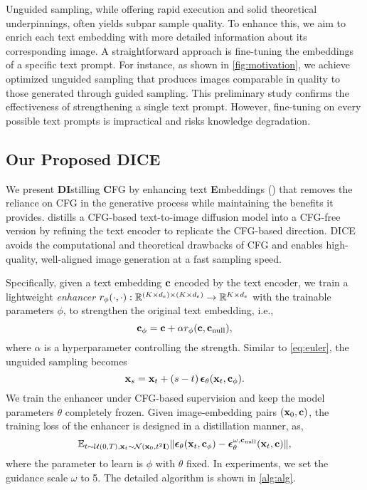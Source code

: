 Unguided sampling, while offering rapid execution and solid theoretical underpinnings, often yields subpar sample quality. To enhance this, we aim to enrich each text embedding with more detailed information about its corresponding image. A straightforward approach is fine-tuning the embeddings of a specific text prompt. For instance, as shown in \cref{fig:motivation}, we achieve optimized unguided sampling that produces images comparable in quality to those generated through guided sampling. 
This preliminary study confirms the effectiveness of strengthening a single text prompt. However, fine-tuning on every possible text prompts is impractical and risks knowledge degradation. 

\subsection{Our Proposed DICE}
\label{sec:dice}

We present \textbf{D}\textbf{I}stilling \textbf{C}FG by enhancing text \textbf{E}mbeddings (\ourName) that removes the reliance on CFG in the generative process while maintaining the benefits it provides. \ourName distills a CFG-based text-to-image diffusion model into a CFG-free version by refining the text encoder to replicate the CFG-based direction. DICE avoids the computational and theoretical drawbacks of CFG and enables high-quality, well-aligned image generation at a fast sampling speed.

Specifically, given a text embedding $\mathbf{c}$ encoded by the text encoder, we train a lightweight \textit{enhancer} $r_{\phi}(\cdot,\cdot): \mathbb{R}^{(K\times d_e) \times (K\times d_e)} \rightarrow \mathbb{R}^{K \times d_e}$ with the trainable parameters $\phi$, to strengthen the original text embedding, i.e., 
\begin{equation}
    \label{eq:enhancer}
    \mathbf{c}_{\phi} = \mathbf{c} + \alpha r_{\phi}(\mathbf{c},\mathbf{c}_\text{null}),
\end{equation}
where $\alpha$ is a hyperparameter controlling the strength.
Similar to \cref{eq:euler}, the unguided sampling becomes
\begin{equation}
    \label{eq:euler_cfg}
    \mathbf{x}_s = \mathbf{x}_t + \left(s-t\right)\boldsymbol{\epsilon}_{\theta}(\mathbf{x}_t,\mathbf{c}_{\phi}).
\end{equation}
We train the enhancer under CFG-based supervision and keep the model parameters $\theta$ completely frozen. 
Given image-embedding pairs $(\mathbf{x}_0, \mathbf{c})$, the training loss of the enhancer is designed in a distillation manner, as,
\begin{equation}
    \label{eq:loss}
    \mathbb{E}_{t \sim \mathcal{U}(0,T), \mathbf{x}_t \sim \mathcal{N}(\mathbf{x}_0,t^2\mathbf{I})}\lVert \boldsymbol{\epsilon}_{\theta}(\mathbf{x}_t,\mathbf{c}_\phi) - \boldsymbol{\epsilon}_{\theta}^{\omega,\mathbf{c}_\text{null}}(\mathbf{x}_t,\mathbf{c}) \rVert,
\end{equation}
where the parameter to learn is $\phi$ with $\theta$ fixed. In experiments, we set the guidance scale $\omega$ to 5. The detailed algorithm is shown in \cref{alg:alg}. %


